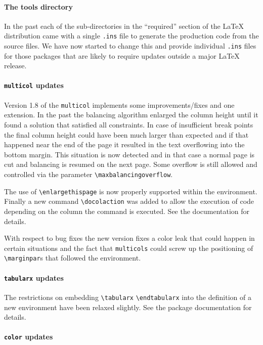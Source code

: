 \documentclass{ltnews}
\begin{document}
\paragraph{The tools directory}

In the past each of the sub-directories in the ``required'' section of
the \LaTeX{} distribution came with a single \texttt{.ins} file to
generate the production code from the source files. We have now
started to change this and provide individual \texttt{.ins} files for
those packages that are likely to require updates outside a major
\LaTeX{} release.

\paragraph{\texttt{multicol} updates}

Version 1.8 of the \texttt{multicol} implements some
improvements/fixes and one extension. In the past the balancing
algorithm enlarged the column height until it found a solution that
satisfied all constraints. In case of insufficient break points the
final column height could have been much larger than expected and if
that happened near the end of the page it resulted in the text
overflowing into the bottom margin. This situation is now detected and
in that case a normal page is cut and balancing is resumed on the next
page. Some overflow is still allowed and controlled via the parameter
\verb=\maxbalancingoverflow=.

The use of \verb=\enlargethispage= is now properly supported
within the environment. Finally a new command \verb=\docolaction= was
added to allow the execution of code depending on the column the
command is executed. See the documentation for details.

With respect to bug fixes the new version fixes a color leak that
could happen in certain situations and the fact that
\texttt{multicols} could screw up the positioning of
\verb=\marginpar=s that followed the environment.

\paragraph{\texttt{tabularx} updates}

The restrictions on embedding \verb|\tabularx| \verb|\endtabularx|
into the definition of a new environment have been relaxed
slightly. See the package documentation for details.

\paragraph{\texttt{color} updates}
\end{document}
